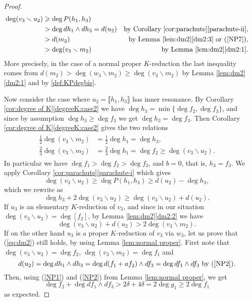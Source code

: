 \documentclass[reqno,oneside,11pt]{amsart}
\theoremstyle{plain}
\theoremstyle{definition}
\newcommand{\llb}{\llbracket}
\newcommand{\rrb}{\rrbracket}
\renewcommand{\ge}{\geqslant}
\begin{document}
\begin{proof}
\begin{align*}
\deg (v_3 \smallsetminus u_2) 
& \ge \deg P(h_1, h_3) \\
&> \deg dh_1 \wedge dh_3 = d(u_2) &\text{by Corollary
\ref{cor:parachute}\ref{parachute-ii}},\\
&> d(m_2) &\text{by Lemma \ref{lem:dm2}\ref{dm2:3} or (\ref{NP7}),}
\\
&> \deg(v_3 \smallsetminus m_2) &\text{by Lemma \ref{lem:dm2}\ref{dm2:1}.}
\end{align*}
More precisely, in the case of a normal proper $K$-reduction the last
inequality comes from $
d(m_2) > \deg (w_3 \smallsetminus m_2) \ge \deg(v_3 \smallsetminus m_2)$ by
Lemma \ref{lem:dm2}\ref{dm2:1} and by \ref{def:KPdegbis}.

Now consider the case where $u_2 = \llb h_1, h_3 \rrb$ has inner resonance.
By Corollary  \ref{cor:degree of K}\ref{degreeK:case2} we have $\deg h_3 = \min \{\deg f_2, \deg f_3\}$, and since by assumption $\deg h_3 \ge \deg f_3$ we get $\deg h_3 = \deg f_3$.
Then Corollary  \ref{cor:degree of K}\ref{degreeK:case2} gives the two relations
\begin{align} \label{eq:v3-m2}
\begin{split}
\tfrac12 \deg(v_3 \smallsetminus m_2) &= \tfrac12 \deg h_1 = \deg h_3, \\
\tfrac23 \deg(v_3 \smallsetminus m_2) &= \tfrac23 \deg h_1 = \deg f_2 \ge \deg
(v_3 \smallsetminus u_2).
\end{split}
\end{align}
In particular we have $\deg f_1 > \deg f_2 > \deg f_3$, and $b=0$, that is, $h_3
= f_3$.
We apply Corollary \ref{cor:parachute}\ref{parachute-i} which gives
$$\deg (v_3 \smallsetminus u_2) \ge \deg P(h_1,h_3) \ge d(u_2) - \deg h_3,$$
which we rewrite as
\begin{equation}\label{eq:intermediate}
\deg h_3 + 2\deg (v_3 \smallsetminus u_2) \ge \deg (v_3 \smallsetminus u_2) +
d(u_2).
\end{equation}
If $u_3$ is an elementary $K$-reduction of $v_3$, and since in our
situation $\deg (v_3 \smallsetminus u_2) = \deg [f_2]$, by Lemma
\ref{lem:dm2}\ref{dm2:2} we have
\begin{equation}\label{eq:dm2}
\deg (v_3 \smallsetminus u_2) + d(u_2) > 2 \deg (v_3 \smallsetminus m_2).
\end{equation}
If on the other hand $u_3$ is a proper $K$-reduction of $v_3$ via $w_3$,
let us prove that (\ref{eq:dm2}) still holds, by using Lemma
\ref{lem:normal proper}.
First note that $\deg (v_3 \smallsetminus u_2) = \deg f_2$, $\deg (v_3 \smallsetminus m_2) = \deg f_1$ and
$$d(u_2) = \deg dh_1 \wedge dh_3 = \deg d(f_1+af_2)\wedge df_3 = \deg df_1 \wedge df_3 \text{ by (\ref{NP2})}.$$
Then, using (\ref{NP1}) and (\ref{NP2}) from Lemma
\ref{lem:normal proper}, we get 
$$\deg f_2 + \deg df_1 \wedge df_3 > 2\delta + 4 \delta = 2\deg g_1 \ge 2 \deg f_1$$
as expected.


\end{proof}
\end{document}
